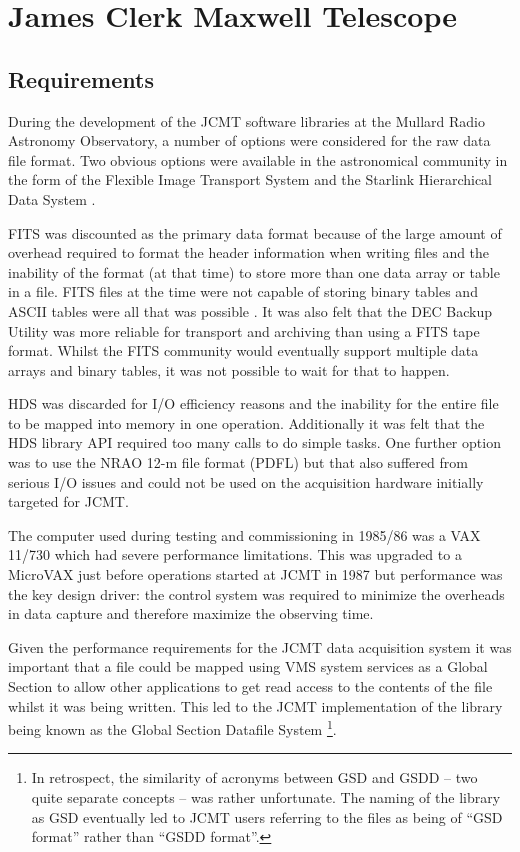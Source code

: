 \documentclass[final,authoryear,5p,times,twocolumn]{elsarticle}
\begin{document}
\section{James Clerk Maxwell Telescope}

\subsection{Requirements}

During the development of the JCMT software libraries at the Mullard
Radio Astronomy Observatory, a number of options were considered for
the raw data file format.  Two obvious options were available in the
astronomical community in the form of the Flexible Image Transport System
\citep[FITS;][]{1981A&AS...44..363W} and the Starlink Hierarchical
Data System \citep[HDS;][]{1982QJRAS..23..485D,2015HDS}.

FITS was discounted as the primary data format because of the large
amount of overhead required to format the header information when
writing files and the inability of the format (at that time) to store
more than one
data array or table in a file. FITS files at the time were not capable
of storing binary tables and ASCII tables were all that was possible
\citep{1988A&AS...73..365H}. It was also felt that the DEC Backup
Utility was more reliable for transport and archiving than using a
FITS tape format. Whilst the FITS community would
eventually support multiple data arrays and binary tables, it was not
possible to wait for that to happen.

HDS was discarded for I/O efficiency reasons and the inability for the
entire file to be mapped into memory in one operation. Additionally it
was felt that the HDS library API required too many calls to do simple
tasks. One further option was to use the NRAO 12-m file format (PDFL)
but that also suffered from serious I/O issues and could not be used
on the acquisition hardware initially targeted for JCMT.

The computer used during testing and commissioning in 1985/86 was a
VAX 11/730 which had severe performance limitations. This was upgraded
to a MicroVAX just before operations started at JCMT in 1987 but
performance was the key design driver: the control system was required
to minimize the overheads in data capture and therefore maximize the
observing time.

Given the performance requirements for the JCMT data acquisition
system it was important that a file could be mapped using VMS system
services as a Global Section to allow other applications to get read
access to the contents of the file whilst it was being written.  This
led to the JCMT implementation of the library being known as the
Global Section Datafile System \citep[GSD;][]{mtin33}\footnote{In retrospect,
the similarity of acronyms between GSD and GSDD -- two quite separate
concepts -- was rather unfortunate. The
  naming of the library as GSD eventually led to JCMT users referring
  to the files as being of ``GSD format'' rather than ``GSDD
  format''.}.
\end{document}
